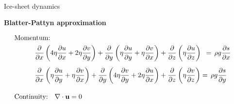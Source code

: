 \documentclass[aspectratio=169,xcolor=dvipsnames]{beamer}
\begin{document}
\begin{frame}[t]{Ice-sheet dynamics}

\vspace{-1.0em}

\begin{center}
\textbf{{\large
Blatter-Pattyn approximation
}}
\end{center}

\small 
\center 

\vspace{-0.5em}
 
    \begin{align*}
    &\text{Momentum:}& \\
    &\quad\quad\quad 
    \pdv{}{x} \left( 4\eta \pdv{u}{x} + 2\eta \pdv{v}{y}\right) +
    \pdv{}{y} \left(  \eta \pdv{u}{y} + \eta \pdv{v}{x} \right) +
    \pdv{}{z} \left( \eta \pdv{u}{z} \right) \,\,\,= \,\rho g \pdv{s}{x} \\[0.5em]
    &\quad\quad\quad 
    \pdv{}{x} \left( \eta \pdv{u}{y} + \eta \pdv{v}{x} \right) + \pdv{}{y} \left( 4\eta \pdv{v}{y} + 2\eta \pdv{u}{x} \right) +
    \pdv{}{z} \left( \eta \pdv{v}{z} \right) = \,\rho g \pdv{s}{y} \\[1em]
    &\text{Continuity:} \quad
    \nabla \cdot \mathbf{u} = 0 &
    \end{align*}
\end{frame}
\end{document}
